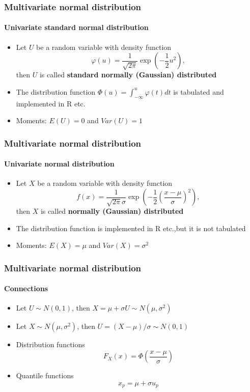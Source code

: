 \documentclass[notes=show]{beamer}
\begin{document}
\begin{frame}\frametitle{Multivariate normal distribution}\framesubtitle{Univariate standard normal distribution}
\begin{itemize}
    \item Let $U$ be a random variable with density function
        \begin{equation*}
            \varphi \left( u\right) =\frac{1}{\sqrt{2\pi }}\exp \left( -\frac{1}{2} u^{2}\right) ,
        \end{equation*}
        then $U$ is called \textbf{standard normally (Gaussian) distributed}
    \item The distribution function $\Phi \left( u\right) =\int_{-\infty}^{u}\varphi \left( t\right) dt$ is tabulated and implemented in R etc.
    \item Moments: $E(U)=0$ and $Var(U)=1$
\end{itemize}
\end{frame}


\begin{frame}\frametitle{Multivariate normal distribution}\framesubtitle{Univariate normal distribution}
\begin{itemize}
    \item Let $X$ be a random variable with density function
        \begin{equation*}
            f\left( x\right) =\frac{1}{\sqrt{2\pi }\sigma }\exp \left( -\frac{1}{2}\left( \frac{x-\mu }{\sigma }\right) ^{2}\right) ,
        \end{equation*}
        then $X$ is called \textbf{normally (Gaussian) distributed}
    \item The distribution function is implemented in R etc.,\newline but it is not tabulated
    \item Moments: $E(X)=\mu $ and $Var(X)=\sigma ^{2}$
\end{itemize}
\end{frame}


\begin{frame}\frametitle{Multivariate normal distribution}\framesubtitle{Connections}
\begin{itemize}
    \item Let $U\sim N\left( 0,1\right) $, then $X=\mu +\sigma U\sim N(\mu,\sigma ^{2})$
    \item Let $X\sim N\left( \mu ,\sigma ^{2}\right) $, then $U=(X-\mu )/\sigma\sim N\left( 0,1\right) $
    \item Distribution functions
        \begin{equation*}
            F_{X}\left( x\right) =\Phi \left( \frac{x-\mu }{\sigma }\right)
        \end{equation*}
    \item Quantile functions
        \begin{equation*}
            x_{p}=\mu +\sigma u_{p}
        \end{equation*}
\end{itemize}
\end{frame}
\end{document}
